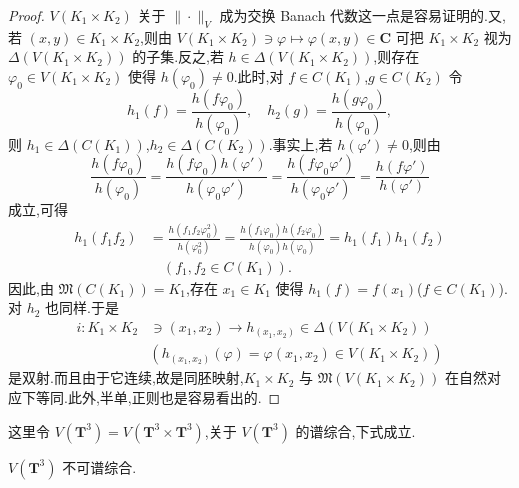 \begin{proof}
$V(K_{1} \times K_{2})$ 关于 $\|\cdot\|_{V}$ 成为交换 Banach 代数这一点是容易证明的.又,若 $(x, y) \in K_{1} \times K_{2}$,则由 $V(K_{1} \times K_{2}) \ni \varphi \mapsto \varphi(x, y) \in \mathbf{C}$ 可把 $K_{1} \times K_{2}$ 视为 $\Delta(V(K_{1} \times K_{2}))$ 的子集.反之,若 $h \in \Delta(V(K_{1} \times K_{2}))$,则存在 $\varphi_{0} \in V(K_{1} \times K_{2})$ 使得 $h(\varphi_{0}) \neq 0$.此时,对 $f \in C(K_{1})$,$g \in C(K_{2})$ 令
\begin{equation*}
h_{1}(f) = \frac{h(f\varphi_{0})}{h(\varphi_{0})},\quad h_{2}(g) = \frac{h(g\varphi_{0})}{h(\varphi_{0})},
\end{equation*}
则 $h_{1} \in \Delta(C(K_{1}))$,$h_{2} \in \Delta(C(K_{2}))$.事实上,若 $h(\varphi') \neq 0$,则由
\begin{equation*}
\frac{h(f\varphi_{0})}{h(\varphi_{0})} = \frac{h(f\varphi_{0})h(\varphi')}{h(\varphi_{0}\varphi')} = \frac{h(f\varphi_{0}\varphi')}{h(\varphi_{0}\varphi')} = \frac{h(f\varphi')}{h(\varphi')}
\end{equation*}
成立,可得
\begin{align*}
h_{1}(f_{1}f_{2}) &= \frac{h(f_{1}f_{2}\varphi_{0}^{2})}{h(\varphi_{0}^{2})} = \frac{h(f_{1}\varphi_{0})h(f_{2}\varphi_{0})}{h(\varphi_{0})h(\varphi_{0})} = h_{1}(f_{1})h_{1}(f_{2})\\
&\quad (f_{1}, f_{2} \in C(K_{1})).
\end{align*}
因此,由 $\mathfrak{M}(C(K_{1})) = K_{1}$,存在 $x_{1} \in K_{1}$ 使得 $h_{1}(f) = f(x_{1})$($f \in C(K_{1})$).对 $h_{2}$ 也同样.于是
\begin{equation*}
\begin{aligned}
i: K_{1} \times K_{2} &\ni (x_{1}, x_{2}) \to h_{(x_{1}, x_{2})} \in \Delta(V(K_{1} \times K_{2}))\\
&(h_{(x_{1}, x_{2})}(\varphi) = \varphi(x_{1}, x_{2}) \in V(K_{1} \times K_{2}))
\end{aligned}
\end{equation*}
是双射.而且由于它连续,故是同胚映射,$K_{1} \times K_{2}$ 与 $\mathfrak{M}(V(K_{1} \times K_{2}))$ 在自然对应下等同.此外,半单,正则也是容易看出的.
\end{proof}

这里令 $V(\mathbf{T}^{3}) = V(\mathbf{T}^{3} \times \mathbf{T}^{3})$,关于 $V(\mathbf{T}^{3})$ 的谱综合,下式成立.

\begin{theorem}\label{thm:3.4.8}
$V(\mathbf{T}^{3})$ 不可谱综合.
\end{theorem}

